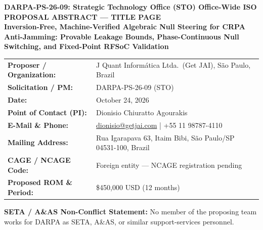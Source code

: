 \documentclass[12pt,letterpaper]{article}
\begin{document}
\thispagestyle{empty}
\begin{center}
    {\large \textbf{DARPA-PS-26-09: Strategic Technology Office (STO) Office-Wide ISO}}\\[2pt]
    {\normalsize \textbf{PROPOSAL ABSTRACT --- TITLE PAGE}}\\[6pt]
    {\Large \textbf{Inversion-Free, Machine-Verified Algebraic Null Steering for CRPA Anti-Jamming: Provable Leakage Bounds, Phase-Continuous Null Switching, and Fixed-Point RFSoC Validation}}\\[8pt]
\end{center}

\begin{tabular}{@{}p{2.1in}p{4.2in}@{}}
\toprule
\textbf{Proposer / Organization:} & J Quant Inform\'atica Ltda.\ (Get JAI), S\~ao Paulo, Brazil \\
\textbf{Solicitation / PM:} & DARPA-PS-26-09 (STO) \\
\textbf{Date:} & October 24, 2026 \\
\textbf{Point of Contact (PI):} & Dionisio Chiuratto Agourakis \\
\textbf{E-Mail \& Phone:} & \href{mailto:dionisio@getjai.com}{dionisio@getjai.com} \quad | \quad +55 11 98787-4110 \\
\textbf{Mailing Address:} & Rua Igarapava 63, Itaim Bibi, S\~ao Paulo/SP 04531-100, Brazil \\
\textbf{CAGE / NCAGE Code:} & Foreign entity --- NCAGE registration pending \\
\textbf{Proposed ROM \& Period:} & \$450,000 USD (12 months) \\
\bottomrule
\end{tabular}

\vspace{6pt}
\textbf{SETA / A\&AS Non-Conflict Statement:} No member of the proposing team works for DARPA as SETA, A\&AS, or similar support-services personnel.
\end{document}

